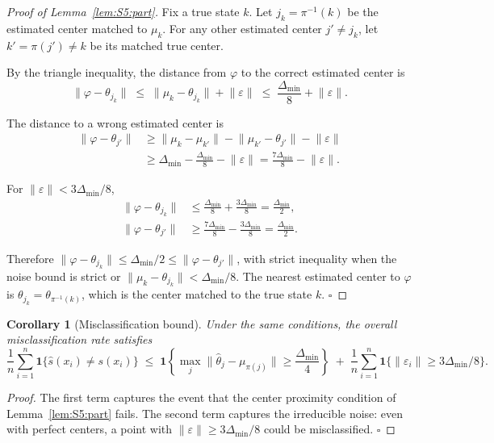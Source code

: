 \documentclass[twoside]{article}
\theoremstyle{plain}
\newtheorem{corollary}[theorem]{Corollary}
\theoremstyle{definition}
\theoremstyle{remark}
\newcommand{\1}{\mathbf{1}}
\renewcommand{\phi}{\varphi}
\newcommand{\muk}{\mu_k}
\newcommand{\norm}[1]{\lVert#1\rVert}
\newcommand{\ind}{\mathbf{1}}
\begin{document}
\begin{proof}[Proof of Lemma~\ref{lem:S5:part}]
Fix a true state $k$.  Let $j_k=\pi^{-1}(k)$ be the estimated center
matched to $\muk$.  For any other estimated center $j'\neq j_k$, let
$k'=\pi(j')\neq k$ be its matched true center.

By the triangle inequality, the distance from $\phi$ to the correct
estimated center is
\[
\norm{\phi-\theta_{j_k}}
\;\le\; \norm{\muk-\theta_{j_k}} + \norm{\varepsilon}
\;\le\; \frac{\Delta_{\min}}{8} + \norm{\varepsilon}.
\]

The distance to a wrong estimated center is
\begin{align*}
\norm{\phi-\theta_{j'}}
&\ge \norm{\muk-\mu_{k'}} - \norm{\mu_{k'}-\theta_{j'}} - \norm{\varepsilon} \\
&\ge \Delta_{\min} - \frac{\Delta_{\min}}{8} - \norm{\varepsilon}
= \frac{7\Delta_{\min}}{8} - \norm{\varepsilon}.
\end{align*}

For $\norm{\varepsilon}<3\Delta_{\min}/8$,
\begin{align*}
\norm{\phi-\theta_{j_k}}
&\le \frac{\Delta_{\min}}{8} + \frac{3\Delta_{\min}}{8}
= \frac{\Delta_{\min}}{2}, \\[4pt]
\norm{\phi-\theta_{j'}}
&\ge \frac{7\Delta_{\min}}{8} - \frac{3\Delta_{\min}}{8}
= \frac{\Delta_{\min}}{2}.
\end{align*}

Therefore $\norm{\phi-\theta_{j_k}}\le\Delta_{\min}/2\le
\norm{\phi-\theta_{j'}}$, with strict inequality when the noise bound
is strict or $\norm{\muk-\theta_{j_k}}<\Delta_{\min}/8$.  The nearest
estimated center to $\phi$ is $\theta_{j_k}=\theta_{\pi^{-1}(k)}$, which
is the center matched to the true state $k$.  \hfill$\square$
\end{proof}

\begin{corollary}[Misclassification bound]
\label{cor:S5:misc}
Under the same conditions, the overall misclassification rate satisfies
\[
\frac1n\sum_{i=1}^n\ind\{\hat s(x_i)\neq s(x_i)\}
\;\le\; \ind\!\left\{\max_j\norm{\hat\theta_j-\mu_{\pi(j)}}
                \ge\frac{\Delta_{\min}}{4}\right\}
\;+\; \frac1n\sum_{i=1}^n\ind\{\norm{\varepsilon_i}\ge3\Delta_{\min}/8\}.
\]
\end{corollary}

\begin{proof}
The first term captures the event that the center proximity condition of
Lemma~\ref{lem:S5:part} fails.  The second term captures the irreducible
noise: even with perfect centers, a point with
$\norm{\varepsilon}\ge3\Delta_{\min}/8$ could be misclassified. \hfill$\square$
\end{proof}
\end{document}
